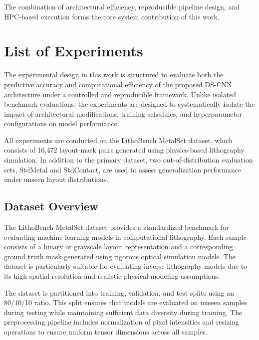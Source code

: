 \documentclass[conference]{IEEEtran}
\begin{document}
The combination of architectural efficiency, reproducible pipeline design, and HPC-based execution forms the core system contribution of this work.









\section{\textbf{List of Experiments}}

The experimental design in this work is structured to evaluate both the predictive accuracy and computational efficiency of the proposed DS-CNN architecture under a controlled and reproducible framework. Unlike isolated benchmark evaluations, the experiments are designed to systematically isolate the impact of architectural modifications, training schedules, and hyperparameter configurations on model performance.

All experiments are conducted on the LithoBench MetalSet dataset, which consists of 16,472 layout-mask pairs generated using physics-based lithography simulation. In addition to the primary dataset, two out-of-distribution evaluation sets, StdMetal and StdContact, are used to assess generalization performance under unseen layout distributions.

\subsection{\textbf{Dataset Overview}}

The LithoBench MetalSet dataset provides a standardized benchmark for evaluating machine learning models in computational lithography. Each sample consists of a binary or grayscale layout representation and a corresponding ground truth mask generated using rigorous optical simulation models. The dataset is particularly suitable for evaluating inverse lithography models due to its high spatial resolution and realistic physical modeling assumptions.

The dataset is partitioned into training, validation, and test splits using an 80/10/10 ratio. This split ensures that models are evaluated on unseen samples during testing while maintaining sufficient data diversity during training. The preprocessing pipeline includes normalization of pixel intensities and resizing operations to ensure uniform tensor dimensions across all samples.
\end{document}
